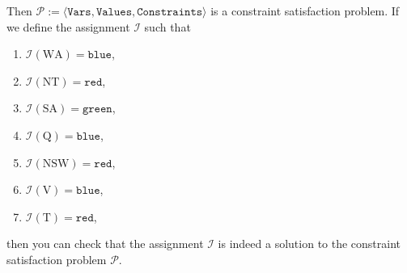 Then $\mathcal{P} := \langle \texttt{Vars}, \texttt{Values}, \texttt{Constraints} \rangle$ is a constraint satisfaction problem.  
If we define the assignment $\mathcal{I}$ such that
\begin{enumerate}
\item $\mathcal{I}(\mathrm{WA}) = \texttt{blue}$,
\item $\mathcal{I}(\mathrm{NT}) = \texttt{red}$,
\item $\mathcal{I}(\mathrm{SA}) = \texttt{green}$,
\item $\mathcal{I}(\mathrm{Q}) = \texttt{blue}$,
\item $\mathcal{I}(\mathrm{NSW}) = \texttt{red}$,
\item $\mathcal{I}(\mathrm{V}) = \texttt{blue}$,
\item $\mathcal{I}(\mathrm{T}) = \texttt{red}$,
\end{enumerate}
then you can check that the assignment $\mathcal{I}$ is indeed a solution to the constraint satisfaction problem $\mathcal{P}$.

